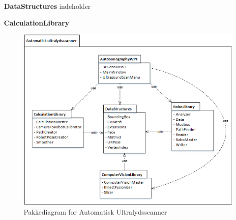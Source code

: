 \textbf{DataStructures} indeholder

\textbf{CalculationLibrary}

\begin{figure}[H]
    \centering
    \includegraphics[width=1\textwidth]{figurer/d/Design/Pakkediagram}
    \caption{Pakkediagram for Automatisk Ultralydsscanner}
    \label{Pakkediagram}
\end{figure}
\newpage
